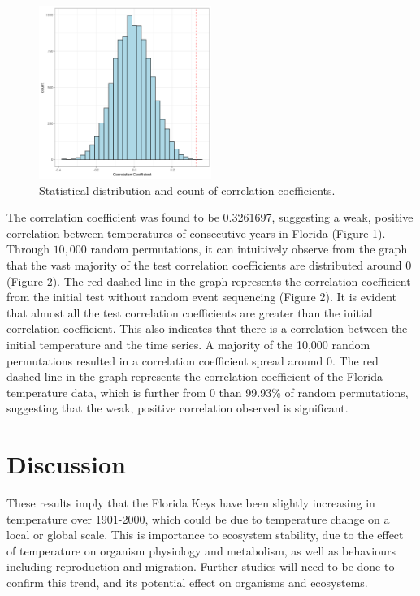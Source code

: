 \documentclass[a4paper,12pt, twocolumn]{article}
\begin{document}
  \begin{figure}[h]
    \centering
    \includegraphics[width=0.5\textwidth]{../data/ats_random_plot.png}
    \caption{Statistical distribution and count of correlation coefficients.}
  \end{figure}
  \noindent The correlation coefficient was found to be 0.3261697, suggesting a weak, positive correlation between temperatures of consecutive years in Florida (Figure 1). Through $10,000$ random permutations, it can intuitively observe from the graph that the vast majority of the test correlation coefficients are distributed around 0 (Figure 2). The red dashed line in the graph represents the correlation coefficient from the initial test without random event sequencing (Figure 2). It is evident that almost all the test correlation coefficients are greater than the initial correlation coefficient. This also indicates that there is a correlation between the initial temperature and the time series. A majority of the 10,000 random permutations resulted in a correlation coefficient spread around 0. The red dashed line in the graph represents the correlation coefficient of the Florida temperature data, which is further from 0 than 99.93\% of random permutations, suggesting that the weak, positive correlation observed is significant. \\
  
\section{Discussion}
\noindent These results imply that the Florida Keys have been slightly increasing in temperature over 1901-2000, which could be due to temperature change on a local or global scale. This is importance to ecosystem stability, due to the effect of temperature on organism physiology and metabolism, as well as behaviours including reproduction and migration. Further studies will need to be done to confirm this trend, and its potential effect on organisms and ecosystems.
\end{document}
